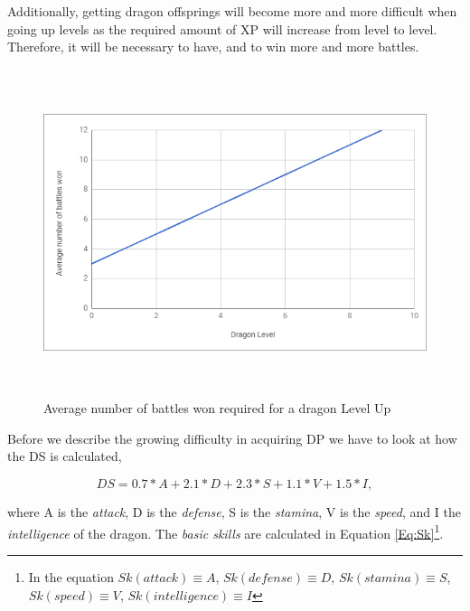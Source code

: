 \documentclass[12pt]{article}
\begin{document}
{Additionally, getting dragon offsprings will become more and more difficult when going up levels as the required amount of XP will increase from level to level. Therefore, it will be necessary to have, and to win more and more battles.\par
\begin{Center}
\begin{figure}[!ht]
	\begin{Center}
		\includegraphics[width=6.09in,height=3.77in]{./media/image17.png}
		\caption{Average number of battles won required for a dragon Level Up}
		\label{fig:Average_number_of_battles_won_required_for_a_dragon_Level_Up}
	\end{Center}
\end{figure}
\end{Center}
Before we describe the growing difficulty in acquiring DP we have to look at how the DS is calculated,\par
\begin{center}
  \begin{equation} \label{Eq:DS}
    DS=0.7*A+2.1*D+2.3*S+1.1*V+1.5*I,
  \end{equation}
\end{center}
where A is the \textit{attack}, D is the \textit{defense}, S is the \textit{stamina}, V is the \textit{speed}, and I the \textit{intelligence} of the dragon. The \textit{basic skills} are calculated in Equation \ref{Eq:Sk}\footnote{In the equation $Sk(attack)\equiv A$, $Sk(defense)\equiv D$, $Sk(stamina)\equiv S$, $Sk(speed)\equiv V$, $Sk(intelligence)\equiv I$}.  \par

}
\end{document}
